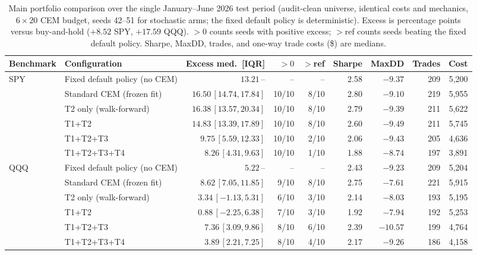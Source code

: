 \begin{table}[t]
\caption{Main portfolio comparison over the single January--June 2026 test period (audit-clean universe, identical costs and mechanics, $6\times20$ CEM budget, seeds 42--51 for stochastic arms; the fixed default policy is deterministic). Excess is percentage points versus buy-and-hold ($+8.52$ SPY, $+17.59$ QQQ). $>0$ counts seeds with positive excess; $>$ref counts seeds beating the fixed default policy. Sharpe, MaxDD, trades, and one-way trade costs (\$) are medians.}
\label{tab:cemmain}
\centering
\footnotesize
\setlength{\tabcolsep}{3.4pt}
\begin{tabular}{llrrrrrrr}
\toprule
Benchmark & Configuration & Excess med.\ [IQR] & $>0$ & $>$ref & Sharpe & MaxDD & Trades & Cost \\
\midrule
SPY & Fixed default policy (no CEM) & $13.21$\,-- & -- & -- & 2.58 & $-9.37$ & 209 & 5,200 \\
 & Standard CEM (frozen fit) & $16.50$\,$[14.74,17.84]$ & 10/10 & 8/10 & 2.80 & $-9.10$ & 219 & 5,955 \\
 & T2 only (walk-forward) & $16.38$\,$[13.57,20.34]$ & 10/10 & 8/10 & 2.79 & $-9.39$ & 211 & 5,622 \\
 & T1+T2 & $14.83$\,$[13.39,17.89]$ & 10/10 & 8/10 & 2.60 & $-9.49$ & 211 & 5,745 \\
 & T1+T2+T3 & $9.75$\,$[5.59,12.33]$ & 10/10 & 2/10 & 2.06 & $-9.43$ & 205 & 4,636 \\
 & T1+T2+T3+T4 & $8.26$\,$[4.31,9.63]$ & 10/10 & 1/10 & 1.88 & $-8.74$ & 197 & 3,891 \\
\midrule
QQQ & Fixed default policy (no CEM) & $5.22$\,-- & -- & -- & 2.43 & $-9.23$ & 209 & 5,204 \\
 & Standard CEM (frozen fit) & $8.62$\,$[7.05,11.85]$ & 9/10 & 8/10 & 2.75 & $-7.61$ & 221 & 5,915 \\
 & T2 only (walk-forward) & $3.34$\,$[-1.13,5.31]$ & 6/10 & 3/10 & 2.14 & $-8.03$ & 193 & 5,195 \\
 & T1+T2 & $0.88$\,$[-2.25,6.38]$ & 7/10 & 3/10 & 1.92 & $-7.94$ & 192 & 5,253 \\
 & T1+T2+T3 & $7.36$\,$[3.09,9.86]$ & 8/10 & 6/10 & 2.39 & $-10.57$ & 199 & 4,764 \\
 & T1+T2+T3+T4 & $3.89$\,$[2.21,7.25]$ & 8/10 & 4/10 & 2.17 & $-9.26$ & 186 & 4,158 \\
\bottomrule
\end{tabular}
\end{table}

